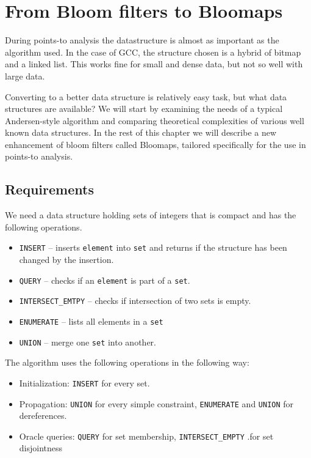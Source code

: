 \chapter{From Bloom filters to Bloomaps}

During points-to analysis the datastructure is almost as important as the
algorithm used. In the case of GCC, the structure chosen is a hybrid of bitmap
and a linked list. This works fine for small and dense data, but not so well
with large data.

Converting to a better data structure is relatively easy task, but what data
structures are available? We will start by examining the needs of a typical
Andersen-style algorithm and comparing theoretical complexities of various well
known data structures. In the rest of this chapter we will describe a new
enhancement of bloom filters called Bloomaps, tailored specifically for the use
in points-to analysis.

\section{Requirements}

We need a data structure holding sets of integers that is compact and has the
following operations.

\begin{itemize}
	\item {\tt INSERT} -- inserts {\tt element} into {\tt set} and returns if
		the structure has been changed by the insertion.
	\item {\tt QUERY} -- checks if an {\tt element} is part of a {\tt set}.
	\item {\tt INTERSECT\_EMTPY} -- checks if intersection of two sets is empty.
	\item {\tt ENUMERATE} -- lists all elements in a {\tt set}
	\item {\tt UNION} -- merge one {\tt set} into another.
\end{itemize}

The algorithm uses the following operations in the following way:

\begin{itemize}
	\item Initialization: {\tt INSERT} for every set.
	\item Propagation: {\tt UNION} for every simple constraint, {\tt ENUMERATE} and
		{\tt UNION} for dereferences.
	\item Oracle queries: {\tt QUERY} for set membership, {\tt INTERSECT\_EMPTY}
		.for set disjointness
\end{itemize}

